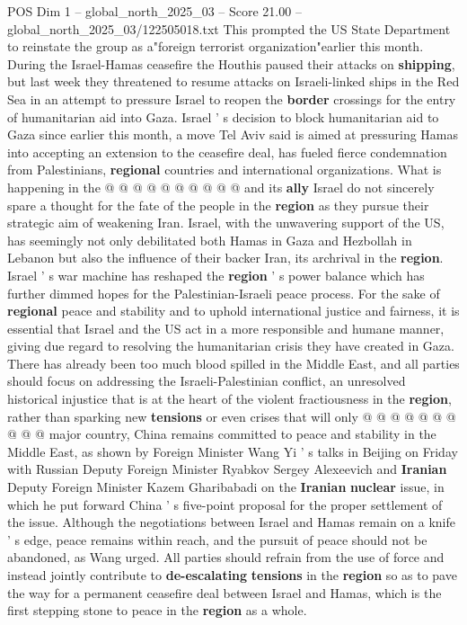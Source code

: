 \begin{textsample}{POS Dim 1 – global\_north\_2025\_03 – Score 21.00 – global\_north\_2025\_03/122505018.txt}
This prompted the US State Department to reinstate the group as a"foreign terrorist organization"earlier this month.
During the Israel-Hamas ceasefire the Houthis paused their attacks on \textbf{shipping}, but last week they threatened to resume attacks on Israeli-linked ships in the Red Sea in an attempt to pressure Israel to reopen the \textbf{border} crossings for the entry of humanitarian aid into Gaza.
Israel ' s decision to block humanitarian aid to Gaza since earlier this month, a move Tel Aviv said is aimed at pressuring Hamas into accepting an extension to the ceasefire deal, has fueled fierce condemnation from Palestinians, \textbf{regional} countries and international organizations.
What is happening in the @ @ @ @ @ @ @ @ @ @ and its \textbf{ally} Israel do not sincerely spare a thought for the fate of the people in the \textbf{region} as they pursue their strategic aim of weakening Iran.
Israel, with the unwavering support of the US, has seemingly not only debilitated both Hamas in Gaza and Hezbollah in Lebanon but also the influence of their backer Iran, its archrival in the \textbf{region}.
Israel ' s war machine has reshaped the \textbf{region} ' s power balance which has further dimmed hopes for the Palestinian-Israeli peace process.
For the sake of \textbf{regional} peace and stability and to uphold international justice and fairness, it is essential that Israel and the US act in a more responsible and humane manner, giving due regard to resolving the humanitarian crisis they have created in Gaza.
There has already been too much blood spilled in the Middle East, and all parties should focus on addressing the Israeli-Palestinian conflict, an unresolved historical injustice that is at the heart of the violent fractiousness in the \textbf{region}, rather than sparking new \textbf{tensions} or even crises that will only @ @ @ @ @ @ @ @ @ @ major country, China remains committed to peace and stability in the Middle East, as shown by Foreign Minister Wang Yi ' s talks in Beijing on Friday with Russian Deputy Foreign Minister Ryabkov Sergey Alexeevich and \textbf{Iranian} Deputy Foreign Minister Kazem Gharibabadi on the \textbf{Iranian} \textbf{nuclear} issue, in which he put forward China ' s five-point proposal for the proper settlement of the issue.
Although the negotiations between Israel and Hamas remain on a knife ' s edge, peace remains within reach, and the pursuit of peace should not be abandoned, as Wang urged.
All parties should refrain from the use of force and instead jointly contribute to \textbf{de-escalating} \textbf{tensions} in the \textbf{region} so as to pave the way for a permanent ceasefire deal between Israel and Hamas, which is the first stepping stone to peace in the \textbf{region} as a whole.

\end{textsample}

